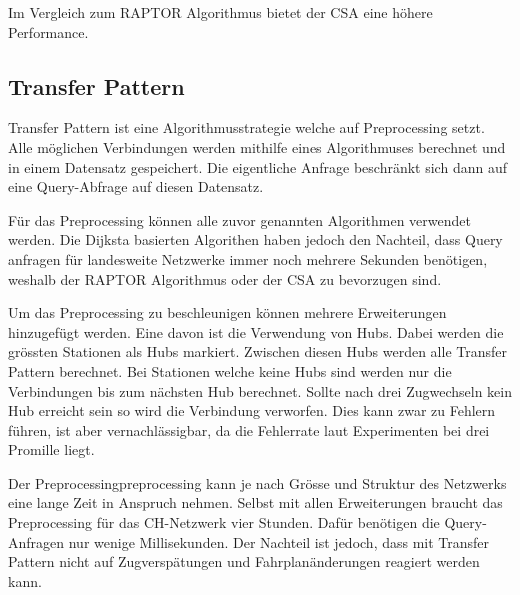 Im Vergleich zum RAPTOR Algorithmus bietet der CSA eine höhere Performance. ~\cite{csa}


\subsection{Transfer Pattern}
\label{sec:Transfer Pattern}
Transfer Pattern ist eine Algorithmusstrategie welche auf Preprocessing setzt. Alle möglichen Verbindungen werden mithilfe eines Algorithmuses berechnet und in einem Datensatz gespeichert. Die eigentliche Anfrage beschränkt sich dann auf eine Query-Abfrage auf diesen Datensatz.

Für das Preprocessing können alle zuvor genannten Algorithmen verwendet werden. Die Dijksta basierten Algorithen haben jedoch den Nachteil, dass Query anfragen für landesweite Netzwerke immer noch mehrere Sekunden benötigen, weshalb der RAPTOR Algorithmus oder der CSA zu bevorzugen sind. ~\cite{transferpatterns_alenex}

Um das Preprocessing zu beschleunigen können mehrere Erweiterungen hinzugefügt werden. Eine davon ist die Verwendung von Hubs. Dabei werden die grössten Stationen als Hubs markiert. Zwischen diesen Hubs werden alle Transfer Pattern berechnet. Bei Stationen welche keine Hubs sind werden nur die Verbindungen bis zum nächsten Hub berechnet. Sollte nach drei Zugwechseln kein Hub erreicht sein so wird die Verbindung verworfen. Dies kann zwar zu Fehlern führen, ist aber vernachlässigbar, da die Fehlerrate laut Experimenten bei drei Promille liegt. ~\cite{transferpatterns_esa}

Der Preprocessing\gls{preprocessing} kann je nach Grösse und Struktur des Netzwerks eine lange Zeit in Anspruch nehmen. Selbst mit allen Erweiterungen braucht das Preprocessing für das CH-Netzwerk vier Stunden. Dafür benötigen die Query-Anfragen nur wenige Millisekunden. Der Nachteil ist jedoch, dass mit Transfer Pattern nicht auf Zugverspätungen und Fahrplanänderungen reagiert werden kann. 





